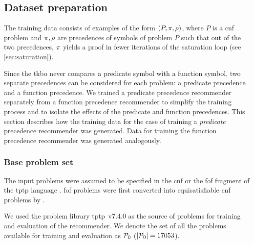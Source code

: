 
\subsection{Dataset preparation}

The training data consists of examples of the form $(P, \pi, \rho)$,
where $P$ is a \gls{cnf} problem and $\pi, \rho$ are precedences of symbols of problem $P$
such that out of the two precedences, $\pi$ yields a proof in fewer iterations of the saturation loop (see \cref{sec:saturation}).

Since the \gls{tkbo} never compares a predicate symbol with a function symbol,
two separate precedences can be considered for each problem:
a predicate precedence and a function precedence.
We trained a predicate precedence recommender separately from a function precedence recommender
to simplify the training process and to isolate the effects of the predicate and function precedences.
This section describes how the training data for the case of training a \emph{predicate} precedence recommender was generated.
Data for training the function precedence recommender was generated analogously.

\subsubsection{Base problem set}

The input problems were assumed to be specified in the \gls{cnf} or the \gls{fof} fragment
of the \acrshort{tptp} language \cite{Sutcliffe2017}.
\Gls{fof} problems were first converted into equisatisfiable \gls{cnf} problems by \Vampire{}.

We used the problem library \acrshort{tptp}~v7.4.0 \cite{Sutcliffe2017}
as the source of problems for training and evaluation of the recommender.
We denote the set of all the problems available for training and evaluation as $\operatorname{\mathcal{P}_{0}}$ ($\lvert\operatorname{\mathcal{P}_{0}}\rvert = 17053$).

